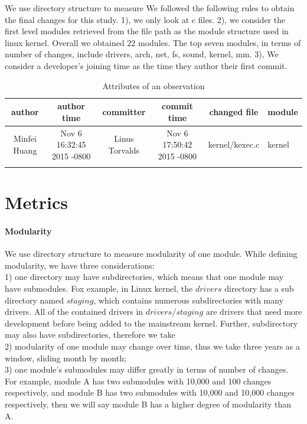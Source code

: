 \documentclass{sig-alternate-05-2015}
\begin{document}
We use directory structure to measure 
We followed the following rules to obtain the final changes for this study.
1), we only look at c files.
2), we consider the first level modules retrieved from the file path 
as the module structure used in linux kernel. Overall we obtained 22 modules.
The top seven modules, in terms of number of changes, include drivers, arch, net, fs, sound, kernel, mm.
3), We consider a developer's joining time as the time they author their first commit.

\begin{table}
\centering
\caption{Attributes of an observation}
\begin{tabular}{c|c|c|c|c|l} \hline
author & author time & committer & commit time & changed file & module\\ \hline
 Minfei Huang & Nov 6 16:32:45 2015 -0800 & Linus Torvalds & Nov 6 17:50:42 2015 -0800 & kernel/kexec.c &kernel\\ \hline
\label{tab:data}
\end{tabular}
\end{table}


\section{Metrics}
\paragraph{Modularity}
We use directory structure to measure modularity of one module. While defining modularity, we have three considerations: \\
1) one directory may have subdirectories, which means that one module may have submodules. Fox example, in Linux kernel, the $drivers$ directory has a sub directory named $staging$, 
which contains numerous subdirectories with many drivers. All of the contained drivers in $drivers/staging$ are drivers that need more development before being added to the mainstream kernel. Further, subdirectory may also have subdirectories, therefore we take\\
2) modularity of one module may change over time, thus we take three years as a window, sliding month by month;\\
3) one module's submodules may differ greatly in terms of number of changes. For example, module A has two submodules with 10,000 and 100 changes respectively, and module B has two submodules with 10,000 and 10,000 changes respectively, then we will say module B has a higher degree of modularity than A.
\end{document}

